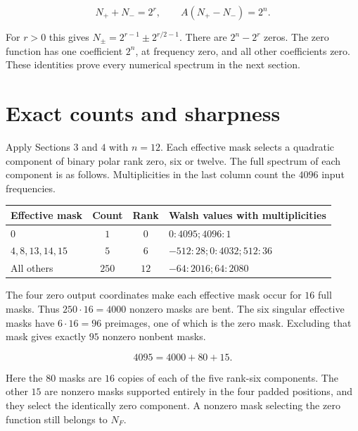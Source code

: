 \documentclass[11pt,a4paper]{article}
\theoremstyle{definition}
\begin{document}
\begin{equation}\label{eq:73}
N_++N_-=2^r,\qquad A(N_+-N_-)=2^n.
\end{equation}

For $r>0$ this gives $N_{\pm }=2^{r-1}\pm 2^{r/2-1}$. There are $2^{n}-2^{r}$ zeros. The zero function has one coefficient $2^{n}$, at frequency zero, and all other coefficients zero. These identities prove every numerical spectrum in the next section.


\section{Exact counts and sharpness}\label{sec:counts}

Apply Sections $3$ and $4$ with $n=12$. Each effective mask selects a quadratic component of binary polar rank zero, six or twelve. The full spectrum of each component is as follows. Multiplicities in the last column count the $4096$ input frequencies.


\begin{center}\small\renewcommand{\arraystretch}{1.2}\begin{tabular}{lccp{66mm}}\toprule

Effective mask & Count & Rank & Walsh values with multiplicities \\
\midrule

$0$ & $1$ & $0$ & $0: 4095; 4096: 1$ \\

$4, 8, 13, 14, 15$ & $5$ & $6$ & $-512: 28; 0: 4032; 512: 36$ \\

All others & $250$ & $12$ & $-64: 2016; 64: 2080$ \\

\bottomrule\end{tabular}\end{center}

The four zero output coordinates make each effective mask occur for $16$ full masks. Thus $250\cdot 16=4000$ nonzero masks are bent. The six singular effective masks have $6\cdot 16=96$ preimages, one of which is the zero mask. Excluding that mask gives exactly $95$ nonzero nonbent masks.


\begin{equation}\label{eq:79}
4095=4000+80+15.
\end{equation}

Here the $80$ masks are $16$ copies of each of the five rank-six components. The other $15$ are nonzero masks supported entirely in the four padded positions, and they select the identically zero component. A nonzero mask selecting the zero function still belongs to $N_{F}$.
\end{document}

